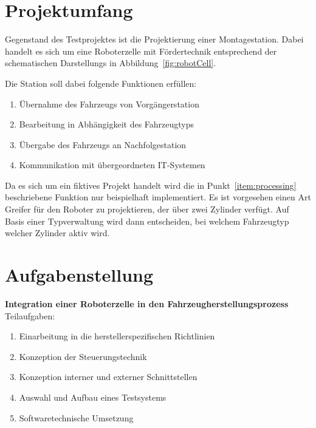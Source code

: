 \section{Projektumfang}
Gegenstand des Testprojektes ist die Projektierung einer Montagestation. Dabei handelt es sich um eine Roboterzelle mit Fördertechnik entsprechend der schematischen Darstellungs in Abbildung~\ref{fig:robotCell}.

Die Station soll dabei folgende Funktionen erfüllen:
\begin{enumerate}
	\itemsep0.1em
	\item Übernahme des Fahrzeugs von Vorgängerstation
	\item \label{item:processing}Bearbeitung in Abhängigkeit des Fahrzeugtyps
	\item Übergabe des Fahrzeugs an Nachfolgestation
	\item Kommunikation mit übergeordneten IT-Systemen
\end{enumerate}

Da es sich um ein fiktives Projekt handelt wird die in Punkt~\ref{item:processing} beschriebene Funktion nur beispielhaft implementiert. Es ist vorgesehen einen Art Greifer für den Roboter zu projektieren, der über zwei Zylinder verfügt. Auf Basis einer Typverwaltung wird dann entscheiden, bei welchem Fahrzeugtyp welcher Zylinder aktiv wird.


\section{Aufgabenstellung}

\textbf{Integration einer Roboterzelle in den Fahrzeugherstellungsprozess}\leer
Teilaufgaben:%
\begin{enumerate}
	\item Einarbeitung in die herstellerspezifischen Richtlinien
	\item Konzeption der Steuerungstechnik
	\item Konzeption interner und externer Schnittstellen
	\item Auswahl und Aufbau eines Testsystems
	\item Softwaretechnische Umsetzung
\end{enumerate}
